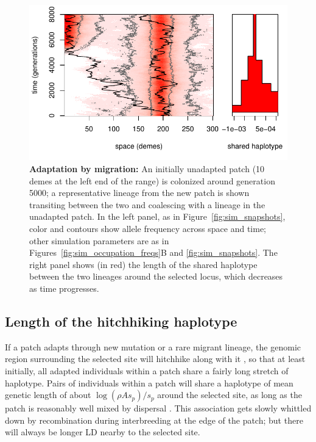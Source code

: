 \documentclass{article}
\begin{document}
\begin{figure}[ht]
  \begin{center}
    \includegraphics{sim-transit.pdf}
  \end{center}
  \caption{
  \textbf{Adaptation by migration:}
  An initially unadapted patch (10 demes at the left end of the range) is colonized around generation 5000;
  a representative lineage from the new patch is shown transiting between the two and coalescing with a lineage
  in the unadapted patch.
  In the left panel, as in Figure~\ref{fig:sim_snapshots}, color and contours show allele frequency across space and time;
  other simulation parameters are as in Figures~\ref{fig:sim_occupation_freqs}B and \ref{fig:sim_snapshots}.
  The right panel shows (in red) the length of the shared haplotype between the two lineages
  around the selected locus,
  which decreases as time progresses.
  \label{fig:lineagesmotion}
  }
\end{figure}




\subsection{Length of the hitchhiking haplotype}
\label{ss:haplotype_length}

If a patch adapts through new mutation or a rare migrant lineage, the
genomic region surrounding the selected site will hitchhike along with it \citep{maynardsmith1974hitchhiking},
so that at least initially, all adapted individuals within a patch
share a fairly long stretch of haplotype. 
Pairs of individuals within a patch will share a haplotype of mean genetic length of
about $\log(\rho A s_p)/s_p$ around the selected site, 
as long as the patch is reasonably well mixed by dispersal
\citep[otherwise see][]{barton2013genetic}.
This association gets slowly whittled down by recombination during interbreeding at the edge of the patch;
but there will always be longer LD nearby to the selected site. 
\end{document}
